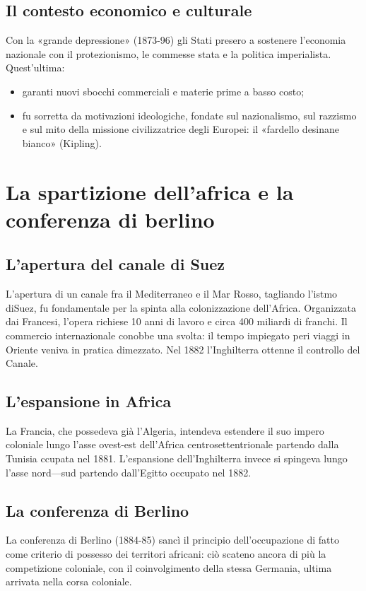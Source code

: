 \documentclass{report}
\begin{document}
\subsection{Il contesto economico e culturale}
Con la «grande depressione» (1873-96) gli Stati presero a sostenere l'economia nazionale con il protezionismo, le commesse stata e la politica imperialista. Quest'ultima:
\begin{itemize}
  \item garanti nuovi sbocchi commerciali e materie
prime a basso costo;
  \item fu sorretta da motivazioni ideologiche, fondate sul nazionalismo, sul razzismo e sul mito della missione civilizzatrice degli Europei: il «fardello desinane bianco» (Kipling).
\end{itemize}

\section{La spartizione dell'africa e la conferenza di berlino}
\subsection{L'apertura del canale di Suez}
L'apertura di un canale fra il Mediterraneo e il Mar Rosso, tagliando l'istmo diSuez, fu fondamentale per la spinta alla colonizzazione dell'Africa. Organizzata dai Francesi, l'opera richiese 10 anni di lavoro e circa 400 miliardi di franchi. Il commercio internazionale conobbe una svolta: il tempo impiegato peri viaggi in Oriente veniva in pratica dimezzato. Nel 1882 l'Inghilterra ottenne il controllo del Canale.

\subsection{L'espansione in Africa}
La Francia, che possedeva già l'Algeria, intendeva estendere il suo impero coloniale lungo l'asse ovest-est dell'Africa centrosettentrionale partendo dalla Tunisia ccupata nel 1881.
L'espansione dell'Inghilterra invece si spingeva lungo l'asse nord—sud partendo dall'Egitto occupato nel 1882.

\subsection{La conferenza di Berlino}
La conferenza di Berlino (1884-85) sancì il principio dell'occupazione di fatto come criterio di possesso dei territori africani: ciò scateno ancora di più la competizione coloniale, con il coinvolgimento della stessa Germania, ultima arrivata nella corsa coloniale.
\end{document}
